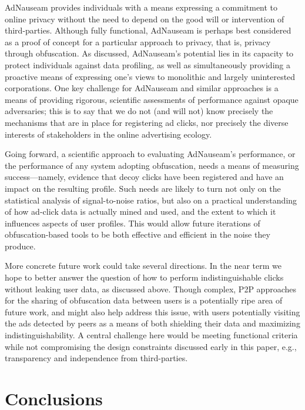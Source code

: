 \documentclass[conference]{IEEEtran}
\begin{document}
AdNauseam provides individuals with a means expressing a commitment to online privacy without the need to depend on the good will or intervention of third-parties. Although fully functional, AdNauseam is perhaps best considered as a proof of concept for a particular approach to privacy, that is, privacy through obfuscation. As discussed, AdNauseam's potential lies in its capacity to protect individuals against data profiling, as well as simultaneously providing a proactive means of expressing one's views to monolithic and largely uninterested corporations. One key challenge for AdNauseam and similar approaches is a means of providing rigorous, scientific assessments of performance against opaque adversaries; this is to say that we do not (and will not) know precisely the mechanisms that are in place for registering ad clicks, nor precisely the diverse interests of stakeholders in the online advertising ecology.

Going forward, a scientific approach to evaluating AdNauseam's performance, or the performance of any system adopting obfuscation, needs a means of measuring success---namely, evidence that decoy clicks have been registered and have an impact on the resulting profile. Such needs are likely to turn not only on the statistical analysis of signal-to-noise ratios, but also on a practical understanding of how ad-click data is actually mined and used, and the extent to which it influences aspects of user profiles. This would allow future iterations of obfuscation-based tools to be both effective and efficient in the noise they produce.

More concrete future work could take several directions. In the near term we hope to better answer the question of how to perform indistinguishable clicks without leaking user data, as discussed above. Though complex, P2P approaches for the sharing of obfuscation data between users is a potentially ripe area of future work, and might also help address this issue, with users potentially visiting the ads detected by peers as a means of both shielding their data and maximizing indistinguishability. A central challenge here would be meeting functional criteria while not compromising the design constraints discussed early in this paper, e.g., transparency and independence from third-parties.

\section{Conclusions}
\end{document}
